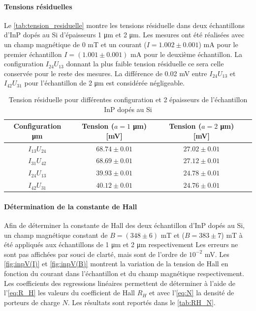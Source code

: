 \paragraph*{Tensions résiduelles}
Le \autoref{tab:tension_residuelle} montre les tensions résiduelle dans deux échantillons d'InP dopés au Si d'épaisseurs 1 \si{\micro\meter} et 2 \si{\micro\meter}. Les mesures ont été réalisées avec un champ magnétique de 0 \si{\milli\tesla} et un courant (\(I = 1.002 \pm 0.001\)) \si{\milli\ampere} pour le premier échantillon \(I = (1.001 \pm 0.001)\) \si{\milli\ampere} pour le deuxième échantillon. La configuration \(I_{24}U_{13}\) donnant la plus faible tension résiduelle ce sera celle conservée pour le reste des mesures. La différence de 0.02 \si{\milli \volt} entre \(I_{24}U_{13}\) et \(I_{42}U_{31}\) pour l'échantillon de 2 \si{\micro\meter} est considérée négligeable.

\begin{table}[h]
    \centering
    \begin{tabulary}{\textwidth}{C C C C}
        \toprule
        Configuration \si{\micro\meter} & Tension (\(a = 1\) \si{\micro\meter}) [\si{\milli\volt}] & Tension (\(a = 2\) \si{\micro\meter}) [\si{\milli\volt}] \\
        \midrule
        \(I_{13}U_{24}\) & \(68.74 \pm 0.01\) & \(27.02 \pm 0.01\) \\
        \(I_{31}U_{42}\) & \(68.69 \pm 0.01\) & \(27.12 \pm 0.01\) \\
        \(I_{24}U_{13}\) & \(39.93 \pm 0.01\) & \(24.78 \pm 0.01\) \\
        \(I_{42}U_{31}\) & \(40.12 \pm 0.01\) & \(24.76 \pm 0.01\) \\
        \bottomrule
    \end{tabulary}
    \caption{Tension résiduelle pour différentes configuration et 2 épaisseurs de l'échantillon InP dopés au Si}
    \label{tab:tension_residuelle}
\end{table}

\paragraph*{Détermination de la constante de Hall}
Afin de déterminer la constante de Hall des deux échantillon d'InP dopés au Si, un champ magnétique constant de \(B = (348 \pm 6)\) \si{\milli\tesla} et (\(B = 383 \pm 7\)) \si{\milli\tesla} à été appliqués aux échantillons de 1 \si{\micro\meter} et 2 \si{\micro\meter} respectivement Les erreurs ne sont pas affichées par souci de clarté, mais sont de l'ordre de \(10^{-2}\) \si{\milli\volt}. Les \autoref{fig:inpV(I)} et \autoref{fig:inpV(B)} montrent la variation de la tension de Hall en fonction du courant dans l'échantillon et du champ magnétique respectivement. Les coefficients des regressions linéaires permettent de déterminer à l'aide de l'\autoref{eq:R_H} les valeurs du coefficient de Hall \(R_H\) et avec l'\autoref{eq:N} la densité de porteurs de charge \(N\). Les résultats sont reportés dans le \autoref{tab:RH_N}.

